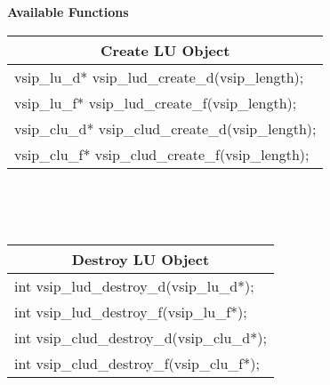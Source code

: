 \\\cvsiplh 
\\ \hspace*{.8cm} \vspace*{.1cm} \textbf{Available Functions }
%
\\ \hspace*{.9cm} {
\ttfamily\vspace{.3cm}
\begin{tabular}[H]{|l|}
\multicolumn{1}{c}{\rmfamily \bfseries Create LU Object\vspace{.1cm}}\\ \hline
vsip\_lu\_d* vsip\_lud\_create\_d(vsip\_length);\\
vsip\_lu\_f* vsip\_lud\_create\_f(vsip\_length);\\
vsip\_clu\_d* vsip\_clud\_create\_d(vsip\_length);\\
vsip\_clu\_f* vsip\_clud\_create\_f(vsip\_length);\\
\hline\end{tabular}\\}
%
\\ \hspace*{.9cm} {
\ttfamily\vspace{.3cm}
\begin{tabular}[H]{|l|}
\multicolumn{1}{c}{\rmfamily \bfseries Destroy LU Object\vspace{.1cm}}\\ \hline
int vsip\_lud\_destroy\_d(vsip\_lu\_d*);\\
int vsip\_lud\_destroy\_f(vsip\_lu\_f*);\\
int vsip\_clud\_destroy\_d(vsip\_clu\_d*);\\
int vsip\_clud\_destroy\_f(vsip\_clu\_f*);\\
\hline\end{tabular}\\}
%
